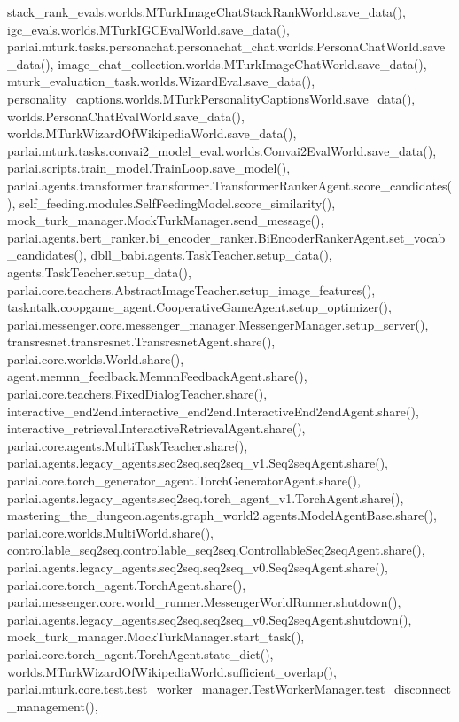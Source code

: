 stack\+\_\+rank\+\_\+evals.\+worlds.\+M\+Turk\+Image\+Chat\+Stack\+Rank\+World.\+save\+\_\+data(), igc\+\_\+evals.\+worlds.\+M\+Turk\+I\+G\+C\+Eval\+World.\+save\+\_\+data(), parlai.\+mturk.\+tasks.\+personachat.\+personachat\+\_\+chat.\+worlds.\+Persona\+Chat\+World.\+save\+\_\+data(), image\+\_\+chat\+\_\+collection.\+worlds.\+M\+Turk\+Image\+Chat\+World.\+save\+\_\+data(), mturk\+\_\+evaluation\+\_\+task.\+worlds.\+Wizard\+Eval.\+save\+\_\+data(), personality\+\_\+captions.\+worlds.\+M\+Turk\+Personality\+Captions\+World.\+save\+\_\+data(), worlds.\+Persona\+Chat\+Eval\+World.\+save\+\_\+data(), worlds.\+M\+Turk\+Wizard\+Of\+Wikipedia\+World.\+save\+\_\+data(), parlai.\+mturk.\+tasks.\+convai2\+\_\+model\+\_\+eval.\+worlds.\+Convai2\+Eval\+World.\+save\+\_\+data(), parlai.\+scripts.\+train\+\_\+model.\+Train\+Loop.\+save\+\_\+model(), parlai.\+agents.\+transformer.\+transformer.\+Transformer\+Ranker\+Agent.\+score\+\_\+candidates(), self\+\_\+feeding.\+modules.\+Self\+Feeding\+Model.\+score\+\_\+similarity(), mock\+\_\+turk\+\_\+manager.\+Mock\+Turk\+Manager.\+send\+\_\+message(), parlai.\+agents.\+bert\+\_\+ranker.\+bi\+\_\+encoder\+\_\+ranker.\+Bi\+Encoder\+Ranker\+Agent.\+set\+\_\+vocab\+\_\+candidates(), dbll\+\_\+babi.\+agents.\+Task\+Teacher.\+setup\+\_\+data(), agents.\+Task\+Teacher.\+setup\+\_\+data(), parlai.\+core.\+teachers.\+Abstract\+Image\+Teacher.\+setup\+\_\+image\+\_\+features(), taskntalk.\+coopgame\+\_\+agent.\+Cooperative\+Game\+Agent.\+setup\+\_\+optimizer(), parlai.\+messenger.\+core.\+messenger\+\_\+manager.\+Messenger\+Manager.\+setup\+\_\+server(), transresnet.\+transresnet.\+Transresnet\+Agent.\+share(), parlai.\+core.\+worlds.\+World.\+share(), agent.\+memnn\+\_\+feedback.\+Memnn\+Feedback\+Agent.\+share(), parlai.\+core.\+teachers.\+Fixed\+Dialog\+Teacher.\+share(), interactive\+\_\+end2end.\+interactive\+\_\+end2end.\+Interactive\+End2end\+Agent.\+share(), interactive\+\_\+retrieval.\+Interactive\+Retrieval\+Agent.\+share(), parlai.\+core.\+agents.\+Multi\+Task\+Teacher.\+share(), parlai.\+agents.\+legacy\+\_\+agents.\+seq2seq.\+seq2seq\+\_\+v1.\+Seq2seq\+Agent.\+share(), parlai.\+core.\+torch\+\_\+generator\+\_\+agent.\+Torch\+Generator\+Agent.\+share(), parlai.\+agents.\+legacy\+\_\+agents.\+seq2seq.\+torch\+\_\+agent\+\_\+v1.\+Torch\+Agent.\+share(), mastering\+\_\+the\+\_\+dungeon.\+agents.\+graph\+\_\+world2.\+agents.\+Model\+Agent\+Base.\+share(), parlai.\+core.\+worlds.\+Multi\+World.\+share(), controllable\+\_\+seq2seq.\+controllable\+\_\+seq2seq.\+Controllable\+Seq2seq\+Agent.\+share(), parlai.\+agents.\+legacy\+\_\+agents.\+seq2seq.\+seq2seq\+\_\+v0.\+Seq2seq\+Agent.\+share(), parlai.\+core.\+torch\+\_\+agent.\+Torch\+Agent.\+share(), parlai.\+messenger.\+core.\+world\+\_\+runner.\+Messenger\+World\+Runner.\+shutdown(), parlai.\+agents.\+legacy\+\_\+agents.\+seq2seq.\+seq2seq\+\_\+v0.\+Seq2seq\+Agent.\+shutdown(), mock\+\_\+turk\+\_\+manager.\+Mock\+Turk\+Manager.\+start\+\_\+task(), parlai.\+core.\+torch\+\_\+agent.\+Torch\+Agent.\+state\+\_\+dict(), worlds.\+M\+Turk\+Wizard\+Of\+Wikipedia\+World.\+sufficient\+\_\+overlap(), parlai.\+mturk.\+core.\+test.\+test\+\_\+worker\+\_\+manager.\+Test\+Worker\+Manager.\+test\+\_\+disconnect\+\_\+management(), 